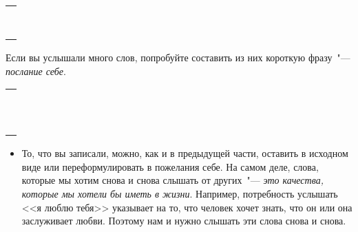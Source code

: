 \setlength{\extrarowheight}{2mm}
\begin{tabularx}{0.96\textwidth}{X}
	\\
	\arrayrulecolor{gray}\hline\\
	\hline\\
	\hline\\
	\hline\\
	\hline\\
	\hline\\
	\hline\\
	\hline\\
	\hline\\
\end{tabularx}
\setlength{\extrarowheight}{0mm}
\begin{itemize}
	\itemWritingHand Если вы услышали много слов, попробуйте составить из них короткую фразу~"--- \emph{послание себе}. 
\end{itemize}

\setlength{\extrarowheight}{2mm}
\begin{tabularx}{0.96\textwidth}{X}
	\\
	\arrayrulecolor{gray}\hline\\
	\hline\\
	\hline\\
	\hline\\
	\hline\\
	\hline\\
	\hline\\
	\hline\\
	\hline\\
	\hline\\
	\hline\\
	\hline\\
\end{tabularx}
\setlength{\extrarowheight}{0mm}
\begin{itemize}
	\item То, что вы записали, можно, как и в предыдущей части, оставить в исходном виде или переформулировать в пожелания себе. На самом деле, слова, которые мы хотим снова и снова слышать  от других~"--- \emph{это качества, которые мы хотели бы иметь в жизни}. Например, потребность услышать <<я люблю тебя>> указывает на то, что человек хочет знать, что он или она заслуживает любви. Поэтому нам и нужно слышать эти слова снова и снова.
\end{itemize}

\vspace{4ex}

